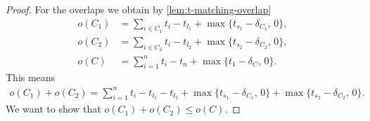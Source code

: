 \documentclass[10pt,a4paper]{amsart}
\begin{document}
\begin{proof}
	For the overlaps we obtain by \cref{lem:t-matching-overlap}
	\begin{align*}
		o(C_1) &= \sum_{i \in C_1} t_i - t_{l_1} + \max\{t_{s_1} - \delta_{C_1},\, 0 \}, \\
		o(C_2) &= \sum_{i \in C_2} t_i - t_{l_2} + \max\{t_{s_2} - \delta_{C_2},\, 0 \}, \\
		o(C) &= \sum_{i=1}^n t_i - t_n + \max\{t_1 - \delta_{C},\, 0 \}.
	\end{align*}
	This means
	\begin{align*}
		o(C_1) + o(C_2) = \sum_{i=1}^n t_i - t_{l_1} - t_{l_2} + \max\{t_{s_1} - \delta_{C_1},\, 0 \} + \max\{t_{s_2} - \delta_{C_2},\, 0 \}.
	\end{align*}
	We want to show that $o(C_1) + o(C_2) \leq o(C)$.
	

\end{proof}
\end{document}

